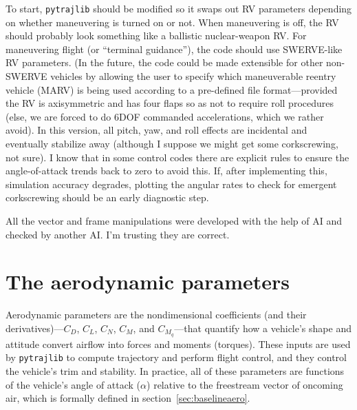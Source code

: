 To start, \texttt{pytrajlib} should be modified so it swaps out RV parameters depending on whether maneuvering is turned on or not. When maneuvering is off, the RV should probably look something like a ballistic nuclear-weapon RV. For maneuvering flight (or ``terminal guidance''), the code should use SWERVE-like RV parameters. (In the future, the code could be made extensible for other non-SWERVE vehicles by allowing the user to specify which maneuverable reentry vehicle (MARV) is being used according to a pre-defined file format---provided the RV is axisymmetric and has four flaps so as not to require roll procedures (else, we are forced to do 6DOF commanded accelerations, which we rather avoid). In this version, all pitch, yaw, and roll effects are incidental and eventually stabilize away (although I suppose we might get some corkscrewing, not sure). I know that in some control codes there are explicit rules to ensure the angle-of-attack trends back to zero to avoid this. If, after implementing this, simulation accuracy degrades, plotting the angular rates to check for emergent corkscrewing should be an early diagnostic step.

All the vector and frame manipulations were developed with the help of AI and checked by another AI. I'm trusting they are correct. 

\section{The aerodynamic parameters}
Aerodynamic parameters are the nondimensional coefficients (and their derivatives)---\(C_D\), \(C_L\), \(C_N\), \(C_M\), and \(C_{M_q}\)---that quantify how a vehicle's shape and attitude convert airflow into forces and moments (torques). These inputs are used by \texttt{pytrajlib} to compute trajectory and perform flight control, and they control the vehicle's trim and stability. In practice, all of these parameters are functions of the vehicle's angle of attack (\(\alpha\)) relative to the freestream vector of oncoming air, which is formally defined in section~\ref{sec:baselineaero}.

